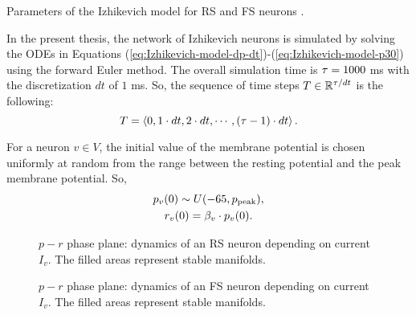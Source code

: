 \begin{table}[!htp] 
    \centering
    
    \caption[Izhikevich parameters: RS and FS neurons]{Parameters of the Izhikevich model for RS and FS neurons \cite{Izhikevich2003}.}
\label{tab:params-izhikevich-model}
\end{table}


In the present thesis, the network of Izhikevich neurons is simulated by solving the ODEs in Equations (\ref{eq:Izhikevich-model-dp-dt})-(\ref{eq:Izhikevich-model-p30}) using the forward Euler method. The overall simulation time is $\tau = 1000$ ms with the discretization $dt$ of $1$ ms. So, the sequence of time steps $T \in \mathbb{R}^{\tau / dt}$ is the following:
\begin{equation}
    T = \left<
        0, 1 \cdot dt, 2 \cdot dt, \cdots, (\tau-1) \cdot dt
    \right>.
\end{equation}

For a neuron $v \in V$, the initial value of the membrane potential is chosen uniformly at random from the range between the resting potential and the peak membrane potential. So, 
\begin{equation}
\begin{gathered}
    p_v(0) \sim U(-65, p_{\mathrm{peak}}), \\
    r_v(0) = \beta_v \cdot p_v(0).
\end{gathered}
\end{equation}

\begin{figure}[!htp]
    \centering
    
    \caption[Dynamics of an RS neuron]{$p-r$ phase plane: dynamics of an RS neuron depending on current $I_v$. The filled areas represent stable manifolds.}
    \label{fig:neural-dynamics-rs}
\end{figure}

\begin{figure}[!htp]
    \centering
    
    \caption[Dynamics of an FS neuron]{$p-r$ phase plane: dynamics of an FS neuron depending on current $I_v$. The filled areas represent stable manifolds.}
    \label{fig:neural-dynamics-fs}
\end{figure}

